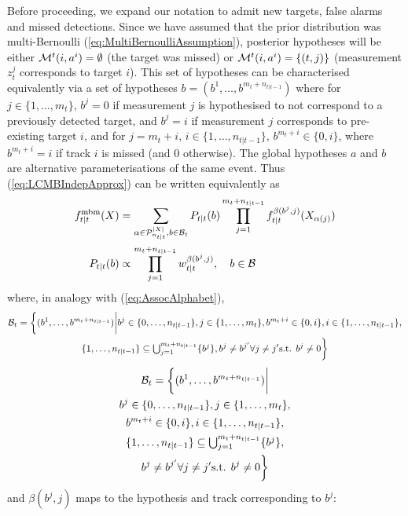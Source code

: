 \documentclass[journal,twoside]{IEEEtran}
\theoremstyle{plain}
\begin{document}
Before proceeding, we expand our notation to admit new targets, false alarms and missed detections. Since we have assumed that the prior distribution was multi-Bernoulli (\ref{eq:MultiBernoulliAssumption}), posterior hypotheses will be either ${\cal M}^t(i,a^i)=\emptyset$ (the target was missed) or ${\cal M}^t(i,a^i)=\{(t,j)\}$ (measurement $z_t^j$ corresponds to target $i$). This set of hypotheses can be characterised equivalently via a set of hypotheses $b=(b^1,\dots,b^{m_t+n_{t|t-1}})$ where for $j\in\{1,\dots,m_t\}$, $b^j=0$ if measurement $j$ is hypothesised to not correspond to a previously detected target, and $b^j=i$ if measurement $j$ corresponds to pre-existing target $i$, and for $j=m_t+i$, $i\in\{1,\dots,n_{t|t-1}\}$, $b^{m_t+i}\in\{0,i\}$, where $b^{m_t+i}=i$ if track $i$ is missed (and $0$ otherwise). The global hypotheses $a$ and $b$ are alternative parameterisations of the same event. Thus (\ref{eq:LCMBIndepApprox}) can be written equivalently as
%
\begin{align}
f^\mathrm{mbm}_{t|t}(X) &= \sum_{\alpha\in{\cal P}_{n_{t|t}}^{|X|},b\in{\cal B}_t} P_{t|t}(b) \label{eq:MOMFullDistribution} \prod_{j=1}^{m_t+n_{t|t-1}}f_{t|t}^{\beta(b^j,j)}(X_{\alpha(j)}) \\
P_{t|t}(b) &\propto \prod_{j=1}^{m_t+n_{t|t-1}}w_{t|t}^{\beta(b^j,j)}, \quad b\in{\cal B}
\end{align}
%
where, in analogy with (\ref{eq:AssocAlphabet}),
%
\ifCLASSOPTIONdraftcls
\begin{multline}\label{eq:MOAssocAlphabet}
{\cal B}_t = \bigg\{(b^1,\dots,b^{m_t+n_{t|t-1}}) \bigg| 
  b^j\in\{0,\dots,n_{t|t-1}\},j\in\{1,\dots,m_t\}, 
  b^{m_t+i}\in\{0,i\},i\in\{1,\dots,n_{t|t-1}\}, \\
  \{1,\dots,n_{t|t-1}\}\subseteq{\textstyle\bigcup_{j=1}^{m_t+n_{t|t-1}}\{b^j\}}, 
  b^j\neq b^{j'} \forall j\neq j' \mbox{s.t. } b^j\neq 0
\bigg\}
\end{multline}
\else
\begin{multline}\label{eq:MOAssocAlphabet}
{\cal B}_t = \bigg\{(b^1,\dots,b^{m_t+n_{t|t-1}}) \bigg| \\
  b^j\in\{0,\dots,n_{t|t-1}\},j\in\{1,\dots,m_t\}, \\
  b^{m_t+i}\in\{0,i\},i\in\{1,\dots,n_{t|t-1}\}, \\
  \{1,\dots,n_{t|t-1}\}\subseteq{\textstyle\bigcup_{j=1}^{m_t+n_{t|t-1}}\{b^j\}}, \\
  b^j\neq b^{j'} \forall j\neq j' \mbox{s.t. } b^j\neq 0
\bigg\}
\end{multline}
\fi
%
and $\beta(b^j,j)$ maps to the hypothesis and track corresponding to $b^j$:
\end{document}
